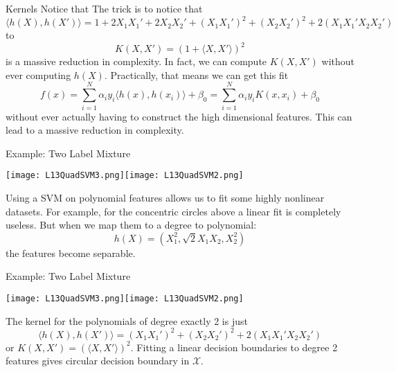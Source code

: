 \documentclass[10pt, table, dvipsnames,xcdraw]{beamer}
\begin{document}
\begin{frame}[fragile]{Kernels}
Notice that 
The trick is to notice that
$$
\langle h(X),h(X')\rangle =  1 + 2X_1X_1' + 2X_2X_2' + (X_1X_1')^2 + (X_2X_2')^2 + 2(X_1X_1'X_2X_2')
$$
to 
$$
K(X,X')  = (1+\langle X,X'\rangle)^2
$$
is a massive reduction in complexity. In fact, we can compute $K(X,X') $ without ever computing $h(X)$. Practically, that means we can get this fit
$$
f(x) = \sum_{i=1}^N\alpha_iy_i \langle h(x),h(x_i)\rangle + \beta_0 = 
\sum_{i=1}^N\alpha_iy_i K(x,x_i)+ \beta_0
$$
without ever actually having to construct the high dimensional features. This can lead to a massive reduction in complexity.
\end{frame}



\begin{frame}[fragile]{Example: Two Label Mixture}
  \begin{minipage}[t][0.6\textheight][t]{\textwidth}
	\centering \texttt{[image: L13QuadSVM3.png]}\texttt{[image: L13QuadSVM2.png]}
  \end{minipage}
  \vfill
\begin{minipage}[t][0.4\textheight][t]{\textwidth}
Using a SVM on polynomial features allows us to fit some highly nonlinear datasets. For example, for the concentric circles above a linear fit is completely useless. But when we map them to a degree to polynomial:
$$
h(X) = (X_1^2,\sqrt2X_1X_2,X_2^2)
$$
the features become separable. 
\end{minipage}
\end{frame}


\begin{frame}[fragile]{Example: Two Label Mixture}
  \begin{minipage}[t][0.6\textheight][t]{\textwidth}
	\centering \texttt{[image: L13QuadSVM3.png]}\texttt{[image: L13QuadSVM2.png]}
  \end{minipage}
  \vfill
\begin{minipage}[t][0.4\textheight][t]{\textwidth}
The kernel for the polynomials of degree exactly 2 is just 
$$
\langle h(X),h(X')\rangle = (X_1X_1')^2 + (X_2X_2')^2 + 2(X_1X_1'X_2X_2') 
$$
or $K(X,X') = (\langle X,X'\rangle)^2$. Fitting a linear decision boundaries to degree 2 features gives circular decision boundary in $\mathcal{X}$. 
\end{minipage}
\end{frame}
\end{document}
